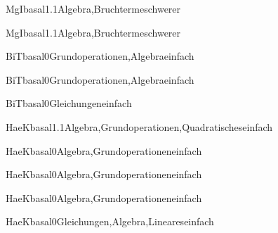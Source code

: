 \documentclass[12pt]{article}
\begin{document}
\begin{Add}{MgI}{basal1.1}{Algebra,Bruchterme}{schwerer}
\end{Add}

\begin{Add}{MgI}{basal1.1}{Algebra,Bruchterme}{schwerer}
\end{Add}



\begin{Add}{BiT}{basal0}{Grundoperationen,Algebra}{einfach}
\end{Add}

\begin{Add}{BiT}{basal0}{Grundoperationen,Algebra}{einfach}
\end{Add}

\begin{Add}{BiT}{basal0}{Gleichungen}{einfach}
      
\end{Add}


\begin{Add}{HaeK}{basal1.1}{Algebra,Grundoperationen,Quadratisches}{einfach}
\end{Add}

\begin{Add}{HaeK}{basal0}{Algebra,Grundoperationen}{einfach}
\end{Add}

\begin{Add}{HaeK}{basal0}{Algebra,Grundoperationen}{einfach}
\end{Add}

\begin{Add}{HaeK}{basal0}{Algebra,Grundoperationen}{einfach}
\end{Add}

\begin{Add}{HaeK}{basal0}{Gleichungen,Algebra,Lineares}{einfach}
      
\end{Add}
\end{document}
